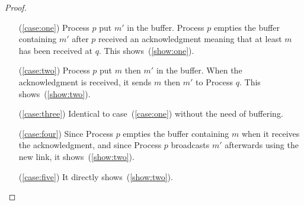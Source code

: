 \begin{proof}
  \begin{itemize}
  \item [(\ref{case:one})] Process $p$ put $m'$ in the buffer. Process $p$
    empties the buffer containing $m'$ after $p$ received an acknowledgment
    meaning that at least $m$ has been received at $q$. This
    shows~(\ref{show:one}).
  \item [(\ref{case:two})] Process $p$ put $m$ then $m'$ in the buffer. When the
    acknowledgment is received, it sends $m$ then $m'$ to Process $q$. This
    shows~(\ref{show:two}).
  \item [(\ref{case:three})] Identical to case~(\ref{case:one}) without the need
    of buffering.
  \item [(\ref{case:four})] Since Process $p$ empties the buffer containing $m$
    when it receives the acknowledgment, and since Process $p$ broadcasts $m'$
    afterwards using the new link, it shows~(\ref{show:two}).
  \item [(\ref{case:five})] It directly shows~(\ref{show:two}).
  \end{itemize}

\end{proof}
